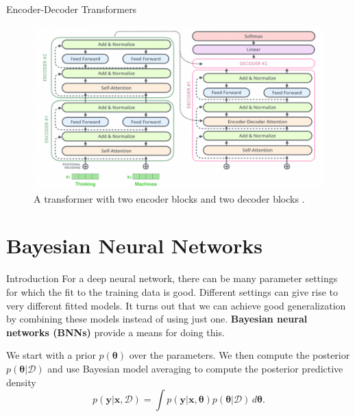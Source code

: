 \documentclass{beamer}
\begin{document}
\begin{frame}{Encoder-Decoder Transformers}
    \begin{figure}
        \centering
        \includegraphics[scale=0.6]{encoder_decoder_transformer}
        \caption{A transformer with two encoder blocks and two decoder blocks \cite{pml2Book}.}
        \label{fig:encoder_decoder_transformer}
    \end{figure}
\end{frame}

\section{Bayesian Neural Networks}

\begin{frame}{Introduction}
    For a deep neural network, there can be many parameter settings for which the fit to the training data is good. Different settings can give rise to very different fitted models. It turns out that we can achieve good generalization by combining these models instead of using just one. \textbf{Bayesian neural networks (BNNs)} provide a means for doing this.
    
    \medskip
    
    We start with a prior $p(\boldsymbol{\theta})$ over the parameters. We then compute the posterior $p(\boldsymbol{\theta} | \mathcal{D})$ and use Bayesian model averaging to compute the posterior predictive density
    \begin{equation*}
        p(\boldsymbol{y} | \boldsymbol{x}, \mathcal{D}) = \int p(\boldsymbol{y} | \boldsymbol{x}, \boldsymbol{\theta})p(\boldsymbol{\theta} | \mathcal{D})\,d\boldsymbol{\theta}.
    \end{equation*}
\end{frame}
\end{document}
